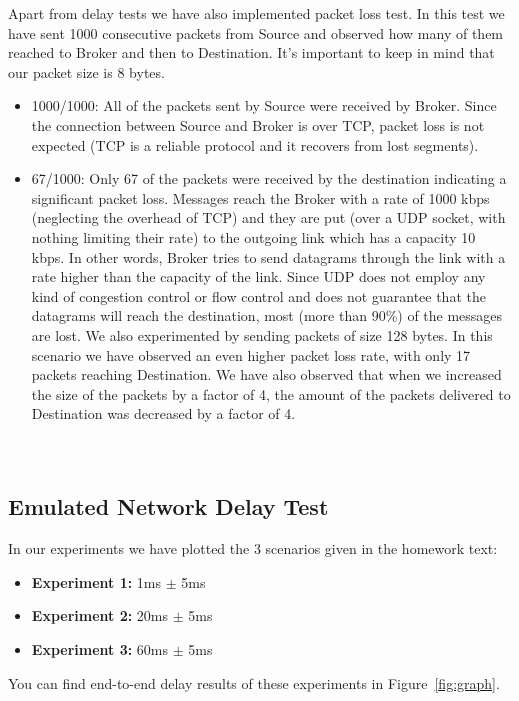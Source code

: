 \documentclass[conference]{IEEEtran}
\begin{document}
Apart from delay tests we have also implemented packet loss test. In this test we have sent 1000 consecutive packets from Source and observed how many of them reached to Broker and then to Destination. It's important to keep in mind that our packet size is 8 bytes. 
\begin{itemize}
    \item 1000/1000: All of the packets sent by Source were received by Broker. Since the connection between Source and Broker is over TCP, packet loss is not expected (TCP is a reliable protocol and it recovers from lost segments).
    \item 67/1000: Only 67 of the packets were received by the destination indicating a significant packet loss. Messages reach the Broker with a rate of 1000 kbps (neglecting the overhead of TCP) and they are put (over a UDP socket, with nothing limiting their rate) to the outgoing link which has a capacity 10 kbps. In other words, Broker tries to send datagrams through the link with a rate higher than the capacity of the link. Since UDP does not employ any kind of congestion control or flow control and does not guarantee that the datagrams will reach the destination, most (more than 90\%) of the messages are lost. We also experimented by sending packets of size 128 bytes. In this scenario we have observed an even higher packet loss rate, with only 17 packets reaching Destination. We have also observed that when we increased the size of the packets by a factor of 4, the amount of the packets delivered to Destination was decreased by a factor of 4. \\ \\ \\
\end{itemize}



\subsection{Emulated Network Delay Test}\label{AA}

In our experiments we have plotted the 3 scenarios given in the homework text:

\begin{itemize}
    \item \textbf{Experiment 1:} 1ms $\pm$ 5ms
    \item \textbf{Experiment 2:} 20ms $\pm$ 5ms
    \item \textbf{Experiment 3:} 60ms $\pm$ 5ms
\end{itemize}
You can find end-to-end delay results of these experiments in Figure~\ref{fig:graph}.
\end{document}
